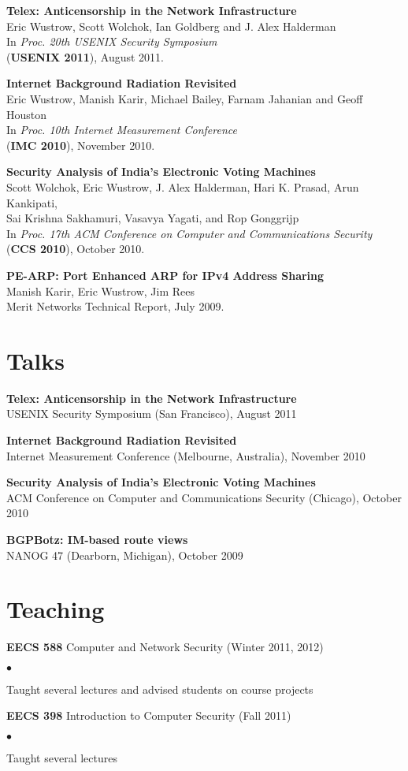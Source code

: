 \documentclass{res}
\newcommand{\sqitem}{\item[\tiny$\blacksquare$]}
\newcommand{\sqlist}{\begin{list}{$\bullet$}
  { \setlength{\itemsep}{0pt}
	\setlength{\parsep}{0pt}
	\setlength{\topsep}{0pt}
	\setlength{\partopsep}{0pt}
	\setlength{\leftmargin}{6.0em}
	\setlength{\labelsep}{2.5em} } }
\newcommand{\sqend}{\end{list}}
\begin{document}
\begin{resume}
    \textbf{Telex: Anticensorship in the Network Infrastructure} \\
    Eric Wustrow, Scott Wolchok, Ian Goldberg and J. Alex Halderman \\
    In \emph{Proc. 20th USENIX Security Symposium} \\
    (\textbf{USENIX 2011}), August 2011.

	\textbf{Internet Background Radiation Revisited} \\
	Eric Wustrow, Manish Karir, Michael Bailey, Farnam Jahanian and Geoff Houston \\
	In \emph{Proc. 10th Internet Measurement Conference} \\
	(\textbf{IMC 2010}), November 2010.
	
	\textbf{Security Analysis of India's Electronic Voting  Machines} \\ 
	Scott Wolchok, Eric Wustrow, J. Alex Halderman, Hari K. Prasad, Arun Kankipati, \\
	Sai Krishna Sakhamuri, Vasavya Yagati, and Rop Gonggrijp \\
	In \emph{Proc. 17th ACM Conference on Computer and Communications 
	Security} \\
	(\textbf{CCS 2010}), October 2010.

	\textbf{PE-ARP: Port Enhanced ARP for IPv4 Address Sharing} \\
	Manish Karir, Eric Wustrow, Jim Rees \\
	Merit Networks Technical Report, July 2009.	

\section{Talks}
    \textbf{Telex: Anticensorship in the Network Infrastructure} \\
    USENIX Security Symposium (San Francisco), August 2011

    \textbf{Internet Background Radiation Revisited} \\
    Internet Measurement Conference (Melbourne, Australia), November 2010

    \textbf{Security Analysis of India's Electronic Voting Machines} \\ 
    ACM Conference on Computer and Communications Security (Chicago), October 2010

    \textbf{BGPBotz: IM-based route views} \\
    NANOG 47 (Dearborn, Michigan), October 2009

\section{Teaching}
    \textbf{EECS 588} Computer and Network Security (Winter 2011, 2012)
        \sqlist
        \sqitem Taught several lectures and advised students on course projects
        \sqend

    \textbf{EECS 398} Introduction to Computer Security (Fall 2011)
        \sqlist
        \sqitem Taught several lectures
        \sqend


\end{resume}
\end{document}
